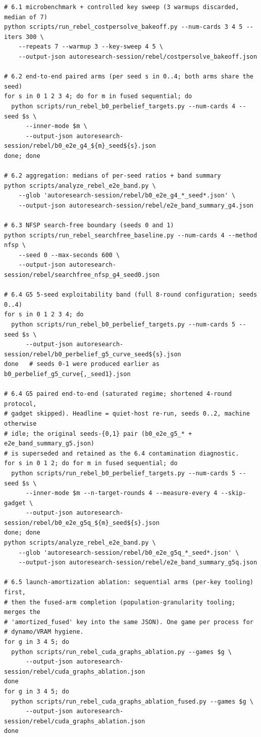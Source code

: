 \documentclass[11pt]{article}
\begin{document}
\begin{small}
\begin{verbatim}
# 6.1 microbenchmark + controlled key sweep (3 warmups discarded, median of 7)
python scripts/run_rebel_costpersolve_bakeoff.py --num-cards 3 4 5 --iters 300 \
    --repeats 7 --warmup 3 --key-sweep 4 5 \
    --output-json autoresearch-session/rebel/costpersolve_bakeoff.json

# 6.2 end-to-end paired arms (per seed s in 0..4; both arms share the seed)
for s in 0 1 2 3 4; do for m in fused sequential; do
  python scripts/run_rebel_b0_perbelief_targets.py --num-cards 4 --seed $s \
      --inner-mode $m \
      --output-json autoresearch-session/rebel/b0_e2e_g4_${m}_seed${s}.json
done; done

# 6.2 aggregation: medians of per-seed ratios + band summary
python scripts/analyze_rebel_e2e_band.py \
    --glob 'autoresearch-session/rebel/b0_e2e_g4_*_seed*.json' \
    --output-json autoresearch-session/rebel/e2e_band_summary_g4.json

# 6.3 NFSP search-free boundary (seeds 0 and 1)
python scripts/run_rebel_searchfree_baseline.py --num-cards 4 --method nfsp \
    --seed 0 --max-seconds 600 \
    --output-json autoresearch-session/rebel/searchfree_nfsp_g4_seed0.json

# 6.4 G5 5-seed exploitability band (full 8-round configuration; seeds 0..4)
for s in 0 1 2 3 4; do
  python scripts/run_rebel_b0_perbelief_targets.py --num-cards 5 --seed $s \
      --output-json autoresearch-session/rebel/b0_perbelief_g5_curve_seed${s}.json
done   # seeds 0-1 were produced earlier as b0_perbelief_g5_curve{,_seed1}.json

# 6.4 G5 paired end-to-end (saturated regime; shortened 4-round protocol,
# gadget skipped). Headline = quiet-host re-run, seeds 0..2, machine otherwise
# idle; the original seeds-{0,1} pair (b0_e2e_g5_* + e2e_band_summary_g5.json)
# is superseded and retained as the 6.4 contamination diagnostic.
for s in 0 1 2; do for m in fused sequential; do
  python scripts/run_rebel_b0_perbelief_targets.py --num-cards 5 --seed $s \
      --inner-mode $m --n-target-rounds 4 --measure-every 4 --skip-gadget \
      --output-json autoresearch-session/rebel/b0_e2e_g5q_${m}_seed${s}.json
done; done
python scripts/analyze_rebel_e2e_band.py \
    --glob 'autoresearch-session/rebel/b0_e2e_g5q_*_seed*.json' \
    --output-json autoresearch-session/rebel/e2e_band_summary_g5q.json

# 6.5 launch-amortization ablation: sequential arms (per-key tooling) first,
# then the fused-arm completion (population-granularity tooling; merges the
# 'amortized_fused' key into the same JSON). One game per process for
# dynamo/VRAM hygiene.
for g in 3 4 5; do
  python scripts/run_rebel_cuda_graphs_ablation.py --games $g \
      --output-json autoresearch-session/rebel/cuda_graphs_ablation.json
done
for g in 3 4 5; do
  python scripts/run_rebel_cuda_graphs_ablation_fused.py --games $g \
      --output-json autoresearch-session/rebel/cuda_graphs_ablation.json
done


\end{verbatim}
\end{small}
\end{document}
